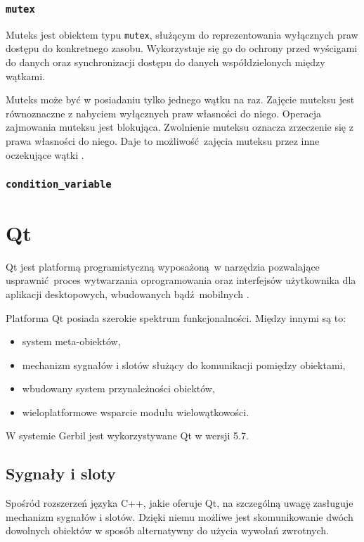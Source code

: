  \subsubsection{\lstinline$mutex$}
Muteks jest obiektem typu \lstinline$mutex$, służącym do reprezentowania wyłącznych praw dostępu do konkretnego zasobu. Wykorzystuje się go do ochrony przed wyścigami do danych oraz synchronizacji dostępu do danych współdzielonych między wątkami.

Muteks może być w posiadaniu tylko jednego wątku na raz. Zajęcie muteksu jest równoznaczne z nabyciem wyłącznych praw własności do niego. Operacja zajmowania muteksu jest blokująca. Zwolnienie muteksu oznacza zrzeczenie się z prawa własności do niego. Daje to możliwość zajęcia muteksu przez inne oczekujące wątki \cite{Stroustrup}.

\subsubsection{\lstinline$condition_variable$}

 \section{Qt}

Qt jest platformą programistyczną wyposażoną w narzędzia pozwalające usprawnić proces wytwarzania oprogramowania oraz interfejsów użytkownika dla aplikacji desktopowych, wbudowanych bądź mobilnych \cite{Qtdoc}.

Platforma Qt posiada szerokie spektrum funkcjonalności. Między innymi są to:
\begin{itemize}
	\item system meta-obiektów,
	\item mechanizm sygnałów i slotów służący do komunikacji pomiędzy obiektami,
	\item wbudowany system przynależności obiektów,
	\item wieloplatformowe wsparcie modułu wielowątkowości.
		
\end{itemize}

W systemie Gerbil jest wykorzystywane Qt w wersji 5.7.

  \subsection{Sygnały i sloty}

Spośród rozszerzeń języka C++, jakie oferuje Qt, na szczególną uwagę zasługuje mechanizm sygnałów i slotów. Dzięki niemu możliwe jest skomunikowanie dwóch dowolnych obiektów w sposób alternatywny do użycia wywołań zwrotnych. 

